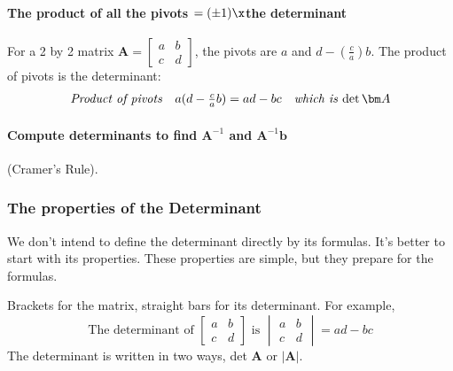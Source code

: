 \paragraph{The product of all the pivots $=(\pm 1)\x$the determinant}

For a 2 by 2 matrix $\bm A=\begin{bmatrix}
a&b\\c&d
\end{bmatrix}$, the pivots are $a$ and $d-(\frac{c}{a})b$. The product of pivots is the determinant:
\[
\begin{array}{lll}
\mbox{\emph{Product of pivots}}
&
a(d-\frac{c}{a}b)=ad-bc
&
\mbox{\emph{which is} $\det\bm A$}
\end{array}
\]
\paragraph{Compute determinants to find $\bm A^{-1}$ and $\bm A^{-1}\bm b$} (Cramer's Rule).

\subsubsection{The properties of the Determinant}
We don't intend to define the determinant directly by its formulas. It's better to start with its properties. These properties are simple, but they prepare for the formulas.
\begin{remark}
Brackets for the matrix, straight bars for its determinant. For example,
\[
\text{The determinant of }\begin{bmatrix}
a&b\\c&d
\end{bmatrix} \text{ is } \begin{vmatrix}
a&b\\c&d\end{vmatrix}=ad-bc
\]
The determinant is written in two ways, det $\bm A$ or $|\bm A|$.
\end{remark}

